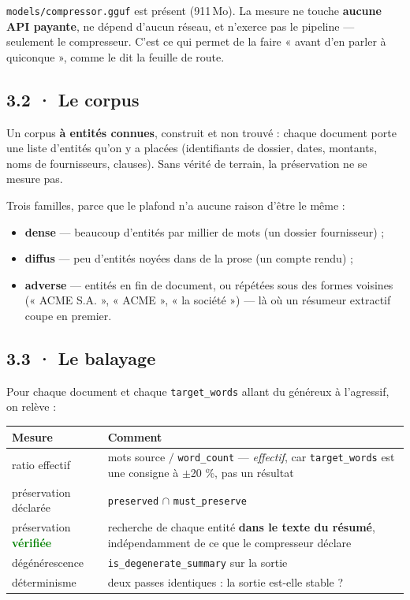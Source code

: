 \documentclass[10pt]{article}
\newcommand{\best}[1]{\textcolor{green}{\textbf{#1}}}
\newcommand{\code}[1]{\texttt{\small #1}}
\begin{document}
\code{models/compressor.gguf} est présent (911\,Mo). La mesure ne touche \textbf{aucune API
payante}, ne dépend d'aucun réseau, et n'exerce pas le pipeline --- seulement le compresseur. C'est
ce qui permet de la faire « avant d'en parler à quiconque », comme le dit la feuille de route.

\subsection{3.2 · Le corpus}

Un corpus \textbf{à entités connues}, construit et non trouvé : chaque document porte une liste
d'entités qu'on y a placées (identifiants de dossier, dates, montants, noms de fournisseurs,
clauses). Sans vérité de terrain, la préservation ne se mesure pas.

Trois familles, parce que le plafond n'a aucune raison d'être le même :
\begin{itemize}[leftmargin=1.2em,itemsep=1.5pt,topsep=2pt]
\item \textbf{dense} --- beaucoup d'entités par millier de mots (un dossier fournisseur) ;
\item \textbf{diffus} --- peu d'entités noyées dans de la prose (un compte rendu) ;
\item \textbf{adverse} --- entités en fin de document, ou répétées sous des formes voisines
      (« ACME S.A. », « ACME », « la société ») --- là où un résumeur extractif coupe en premier.
\end{itemize}

\subsection{3.3 · Le balayage}

Pour chaque document et chaque \code{target\_words} allant du généreux à l'agressif, on relève :

\begin{center}\small
\renewcommand{\arraystretch}{1.22}
\begin{tabular}{@{}>{\raggedright\arraybackslash}p{4.4cm} >{\raggedright\arraybackslash}p{11.4cm}@{}}
\toprule
\textbf{Mesure} & \textbf{Comment} \\
\midrule
ratio effectif & mots source $/$ \code{word\_count} --- \emph{effectif}, car \code{target\_words} est une consigne à $\pm$20 \%, pas un résultat \\
préservation déclarée & \code{preserved} $\cap$ \code{must\_preserve} \\
préservation \best{vérifiée} & recherche de chaque entité \textbf{dans le texte du résumé}, indépendamment de ce que le compresseur déclare \\
dégénérescence & \code{is\_degenerate\_summary} sur la sortie \\
déterminisme & deux passes identiques : la sortie est-elle stable ? \\
\bottomrule
\end{tabular}
\end{center}
\end{document}
